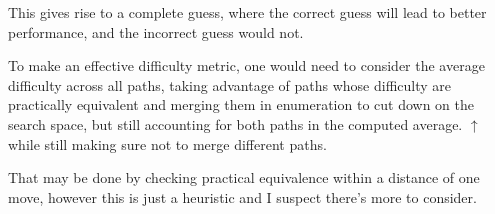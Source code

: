 This gives rise to a complete guess, where the correct guess will lead to better performance, and the incorrect guess would not.

To make an effective difficulty metric, one would need to consider the average difficulty across all paths,
taking advantage of paths whose difficulty are practically equivalent and merging them in enumeration to cut down on the search space,
but still accounting for both paths in the computed average.
$\uparrow$ while still making sure not to merge different paths.

That may be done by checking practical equivalence within a distance of one move,
however this is just a heuristic and I suspect there's more to consider.
